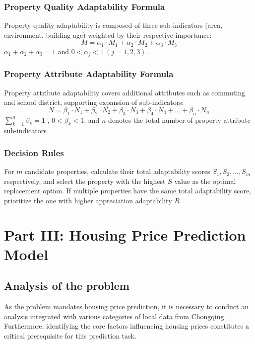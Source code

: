 \documentclass{mcmthesis}
\begin{document}
\subsubsection{Property Quality Adaptability Formula}
Property quality adaptability is composed of three sub-indicators (area, environment, building age) weighted by their respective importance:
\begin{equation}
M = \alpha_1 \cdot M_1 + \alpha_2 \cdot M_2 + \alpha_3 \cdot M_3
\label{eq:quality_adaptability}
\end{equation}
\( \alpha_1+\alpha_2+\alpha_3=1 \)  and \( 0<\alpha_j<1 \ (j=1,2,3) \).

\subsubsection{Property Attribute Adaptability Formula}
Property attribute adaptability covers additional attributes such as commuting and school district, supporting expansion of sub-indicators:
\begin{equation}
N = \beta_1 \cdot N_1 + \beta_2 \cdot N_2 + \beta_3 \cdot N_3 + \beta_4 \cdot N_4 + \dots + \beta_n \cdot N_n
\label{eq:attribute_adaptability}
\end{equation}
\( \sum_{k=1}^n \beta_k = 1 \) , \( 0<\beta_k<1 \), and \( n \) denotes the total number of property attribute sub-indicators 


\subsubsection{ Decision Rules}
For \( m \) candidate properties, calculate their total adaptability scores \( S_1, S_2, \dots, S_m \) respectively, 
and select the property with the highest \( S \) value as the optimal replacement option. 
If multiple properties have the same total adaptability score, prioritize the one with higher appreciation adaptability \( R \) 


\section{Part III: Housing Price Prediction Model } %

\subsection{Analysis of the problem} %
As the problem mandates housing price prediction, 
it is necessary to conduct an analysis integrated with various categories of local data from Chongqing. 
Furthermore, identifying the core factors influencing housing prices constitutes a critical prerequisite 
for this prediction task.
\end{document}
